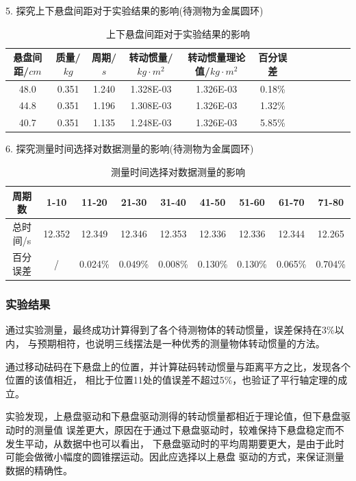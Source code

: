 \documentclass[12pt,hyperref,a4paper,UTF8]{ctexart}
\begin{document}
5. 探究上下悬盘间距对于实验结果的影响(待测物为金属圆环)

\begin{table}[h!]
\centering
\begin{tabular}{|c|c|c|c|c|c|c|c|c|c|c|c|}
        \hline
        悬盘间距/$cm$ & 质量/$kg$ & 周期/$s$ & 转动惯量/$kg·m^2$ & 转动惯量理论值/$kg·m^2$ & 百分误差 \\
        \hline
          48.0 & 0.351 & 1.240 &  1.328E-03 & 1.326E-03 & 0.18\% \\
        \hline
          44.8 & 0.351 & 1.196 &  1.308E-03 & 1.326E-03 & 1.32\% \\
        \hline
          40.7 & 0.351 & 1.135 &  1.248E-03 & 1.326E-03 & 5.85\% \\
        \hline
\end{tabular}
\caption{上下悬盘间距对于实验结果的影响}
\end{table}

6. 探究测量时间选择对数据测量的影响(待测物为金属圆环)

\begin{table}[h!]
\centering
\begin{tabular}{|c|c|c|c|c|c|c|c|c|}
    \hline
    周期数 & 1-10 & 11-20 & 21-30 & 31-40 & 41-50 & 51-60 & 61-70 & 71-80 \\
    \hline
    总时间/s & 12.352 & 12.349 & 12.346 & 12.353 & 12.336 & 12.336 & 12.344 & 12.265 \\
    \hline
    百分误差 & / & 0.024\% & 0.049\% & 0.008\% & 0.130\% & 0.130\% & 0.065\% & 0.704\% \\
    \hline
\end{tabular}
\caption{测量时间选择对数据测量的影响}
\end{table}

\subsubsection{实验结果}

通过实验测量，最终成功计算得到了各个待测物体的转动惯量，误差保持在3\%以内，
与预期相符，也说明三线摆法是一种优秀的测量物体转动惯量的方法。

通过移动砝码在下悬盘上的位置，并计算砝码转动惯量与距离平方之比，发现各个位置的该值相近，
相比于位置11处的值误差不超过5\%，也验证了平行轴定理的成立。

实验发现，上悬盘驱动和下悬盘驱动测得的转动惯量都相近于理论值，但下悬盘驱动时的测量值
误差更大，原因在于通过下悬盘驱动时，较难保持下悬盘稳定而不发生平动，从数据中也可以看出，
下悬盘驱动时的平均周期要更大，是由于此时可能会做微小幅度的圆锥摆运动。因此应选择以上悬盘
驱动的方式，来保证测量数据的精确性。
\end{document}
